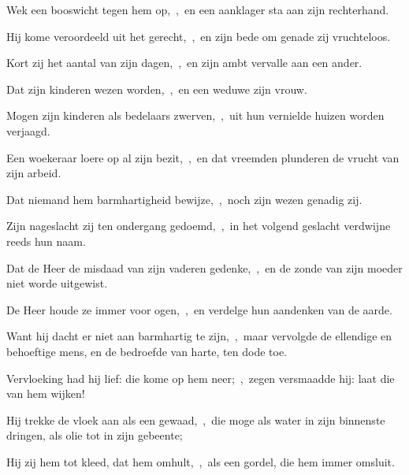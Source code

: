 \documentclass[12pt,twoside,a5paper]{article}
\begin{document}
\begin{halfparskip}
  Wek een booswicht tegen hem op,~\sep\ en een aanklager sta aan zijn rechterhand.

  Hij kome veroordeeld uit het gerecht,~\sep\ en zijn bede om genade zij vruchteloos.

  Kort zij het aantal van zijn dagen,~\sep\ en zijn ambt vervalle aan een ander.

  Dat zijn kinderen wezen worden,~\sep\ en een weduwe zijn vrouw.

  Mogen zijn kinderen als bedelaars zwerven,~\sep\ uit hun vernielde huizen worden verjaagd.

  Een woekeraar loere op al zijn bezit,~\sep\ en dat vreemden plunderen de vrucht van zijn arbeid.

  Dat niemand hem barmhartigheid bewijze,~\sep\ noch zijn wezen genadig zij.

  Zijn nageslacht zij ten ondergang gedoemd,~\sep\ in het volgend geslacht verdwijne reeds hun naam.

  Dat de Heer de misdaad van zijn vaderen gedenke,~\sep\ en de zonde van zijn moeder niet worde uitgewist.

  De Heer houde ze immer voor ogen,~\sep\ en verdelge hun aandenken van de aarde.

  Want hij dacht er niet aan barmhartig te zijn,~\sep\ maar vervolgde de ellendige en behoeftige mens, en de bedroefde van harte, ten dode toe.

  Vervloeking had hij lief: die kome op hem neer;~\sep\ zegen versmaadde hij: laat die van hem wijken!

  Hij trekke de vloek aan als een gewaad,~\sep\ die moge als water in zijn binnenste dringen, als olie tot in zijn gebeente;

  Hij zij hem tot kleed, dat hem omhult,~\sep\ als een gordel, die hem immer omsluit.
\end{halfparskip}

\end{document}
